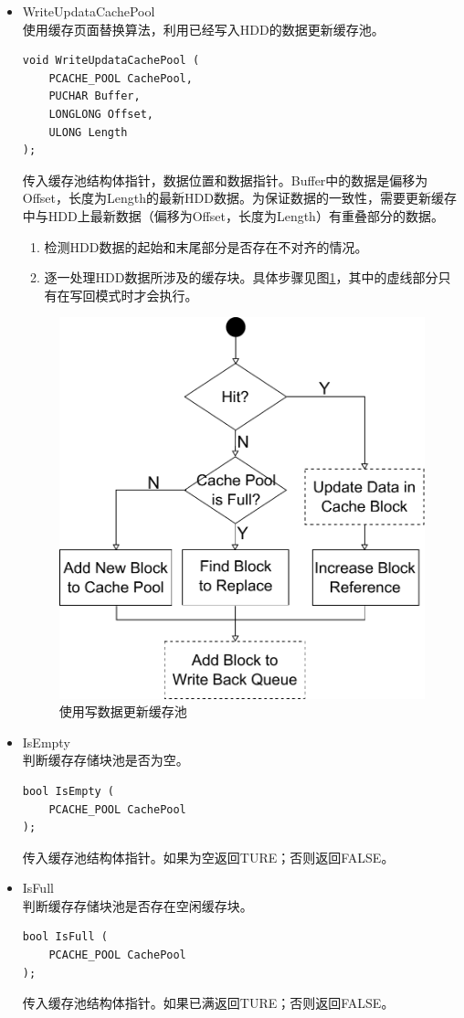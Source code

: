 \begin{itemize}
\item WriteUpdataCachePool
\\使用缓存页面替换算法，利用已经写入HDD的数据更新缓存池。
\begin{lstlisting}
void WriteUpdataCachePool (
    PCACHE_POOL CachePool,
    PUCHAR Buffer,
    LONGLONG Offset,
    ULONG Length
);
\end{lstlisting}
传入缓存池结构体指针，数据位置和数据指针。Buffer中的数据是偏移为Offset，长度为Length的最新HDD数据。为保证数据的一致性，需要更新缓存中与HDD上最新数据（偏移为Offset，长度为Length）有重叠部分的数据。
\begin{enumerate}
\item 检测HDD数据的起始和末尾部分是否存在不对齐的情况。
\item 逐一处理HDD数据所涉及的缓存块。具体步骤见图\ref{fig:write-update-pool}，其中的虚线部分只有在写回模式时才会执行。
\end{enumerate}
\begin{figure}[H]
\centering
\includegraphics[width=0.6\linewidth]{./graph/write-update-pool}
\caption{使用写数据更新缓存池}
\label{fig:write-update-pool}
\end{figure}

\item IsEmpty
\\判断缓存存储块池是否为空。
\begin{lstlisting}
bool IsEmpty (
    PCACHE_POOL CachePool
);
\end{lstlisting}
传入缓存池结构体指针。如果为空返回TURE；否则返回FALSE。

\item IsFull
\\判断缓存存储块池是否存在空闲缓存块。
\begin{lstlisting}
bool IsFull (
    PCACHE_POOL CachePool
);
\end{lstlisting}
传入缓存池结构体指针。如果已满返回TURE；否则返回FALSE。

\end{itemize}

